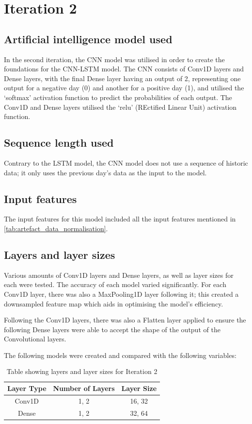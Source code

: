 \section{Iteration 2}
\subsection{Artificial intelligence model used}\label{ssec:iteration2_ai_model}
In the second iteration, the CNN model was utilised in order to create the foundations for the CNN-LSTM model. The CNN
consists of Conv1D layers and Dense layers, with the final Dense layer having an output of 2, representing one output for
a negative day (0) and another for a positive day (1), and utilised the `softmax' activation function to predict the
probabilities of each output. The Conv1D and Dense layers utilised the `relu' (REctified Linear Unit) activation
function.

\subsection{Sequence length used}
Contrary to the LSTM model, the CNN model does not use a sequence of historic data; it only uses the previous day's
data as the input to the model.

\subsection{Input features}
The input features for this model included all the input features mentioned in \autoref{tab:artefact_data_normalisation}.

\subsection{Layers and layer sizes} \label{ssec:iteration2layers}
Various amounts of Conv1D layers and Dense layers, as well as layer sizes for each were tested. The accuracy of each model varied
significantly. For each Conv1D layer, there was also a MaxPooling1D layer following it; this created a downsampled
feature map which aids in optimising the model's efficiency.

Following the Conv1D layers, there was also a Flatten layer applied to ensure the following Dense layers
were able to accept the shape of the output of the Convolutional layers.

The following models were created and compared with the following variables:

\begin{table}[ht]
    \centering
    \begin{tabular}{|c|c|c|}
        \hline
        Layer Type & Number of Layers & Layer Size \\
        \hline\hline
        Conv1D & 1, 2 & 16, 32 \\
        Dense & 1, 2 & 32, 64 \\
        \hline
    \end{tabular}
    \caption{Table showing layers and layer sizes for Iteration 2}
    \label{tab:iteration2_layers}
\end{table}
\FloatBarrier

